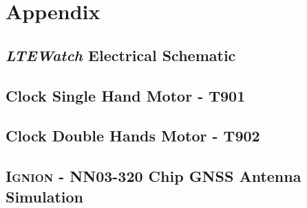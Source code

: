 \documentclass[Report.tex]{subfiles}
\begin{document}
\chapter{Appendix}

%

\section{\textit{LTEWatch} Electrical Schematic}
\begin{landscape}

\label{appendix:LTEWatch_elec_schem}
\end{landscape}

\section{Clock Single Hand Motor - T901}
\begin{landscape}

\label{appendix:motor_t901}
\end{landscape}

\section{Clock Double Hands Motor - T902}
\begin{landscape}

\label{appendix:motor_t902}
\end{landscape}

\section{\textsc{Ignion} - NN03-320 Chip GNSS Antenna Simulation} \label{appendix:LTEWatch_NNS1}

\end{document}
